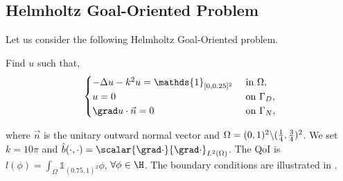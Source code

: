 %
%

\subsection{Helmholtz Goal-Oriented Problem}
Let us consider the following Helmholtz Goal-Oriented problem.
\begin{var_for}
  Find $u$ such that,
  \begin{equation}
    \begin{cases}
      - \Delta u -k^{2}u= \mathds{1}_{[0,0.25]^{2}} & \text{ in } \Omega,       \\
      u=0                                           & \text{ on } {\Gamma_{D}}, \\
      \grad u\cdot \vec{n}=0                        & \text{ on } {\Gamma_{N}},
    \end{cases}
  \end{equation}
\end{var_for}
\noindent where $\vec{n}$ is the unitary outward normal vector and $\Omega=(0,1)^{2}\symbol{92} (\frac{1}{4},\frac{3}{4})^{2}$. We set $k=10 \pi$ and $\hat{b}(\cdot,\cdot)= \scalar{\grad \cdot}{\grad \cdot}_{L^{2}(\Omega)}$. The \ac{QoI} is $l(\phi)=\int_{\Omega} \mathds{1}_{(0.75,1)^{2}}\phi$, $\forall \phi \in \H$. The boundary conditions are illustrated in .

